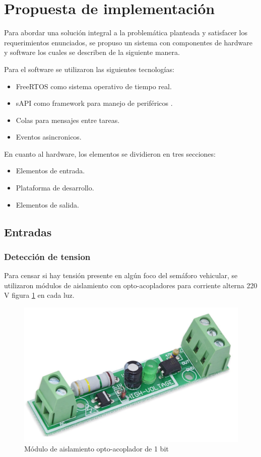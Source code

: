 \section{Propuesta de implementación}

Para abordar una solución integral a la problemática planteada y satisfacer los requerimientos enunciados, se propuso un sistema con componentes de hardware y software los cuales se describen de la siguiente manera.

Para el software se utilizaron las siguientes tecnologías:

\begin{itemize}
	\item FreeRTOS como sistema operativo de tiempo real.
	\item sAPI como framework para manejo de periféricos \citep{sapi}.
	\item Colas para mensajes entre tareas.
	\item Eventos asincronicos.
\end{itemize}

En cuanto al hardware, los elementos se dividieron en tres secciones:

\begin{itemize}
	\item Elementos de entrada.
	\item Plataforma de desarrollo.
	\item Elementos de salida.
\end{itemize}

\subsection{Entradas}

\subsubsection{Detección de tension}

Para censar si hay tensión presente en algún foco del semáforo vehicular, se utilizaron módulos de aislamiento con opto-acopladores para corriente
alterna 220 V figura \ref{fig:moduloOptoacoplador} en cada luz. 

\begin{figure}[h]
	\centering
	\includegraphics[scale=.3]{./Figures/moduloOptoacoplador.pdf}
	\caption{Módulo de aislamiento opto-acoplador de 1 bit}
	\label{fig:moduloOptoacoplador}
\end{figure}

